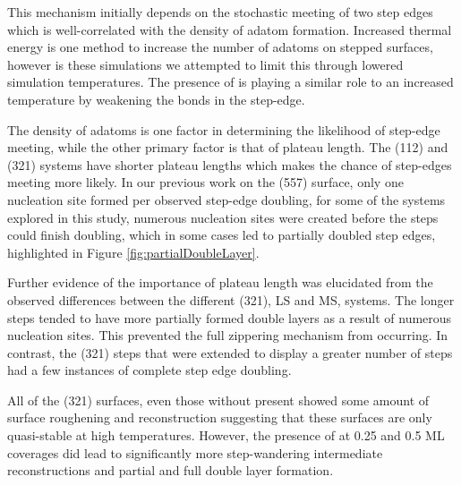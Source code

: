 This mechanism initially depends on the stochastic meeting of two step edges
which is well-correlated with the density of adatom formation. Increased
thermal energy is one method to increase the number of adatoms on stepped
surfaces, however is these simulations we attempted to limit this through
lowered simulation temperatures.  The presence of  is playing a similar
role to an increased temperature by weakening the  bonds in
the step-edge.

The density of adatoms is one factor in determining the likelihood of step-edge
meeting, while the other primary factor is that of plateau length. The (112)
and (321) systems have shorter plateau lengths which makes the chance of
step-edges meeting more likely.  In our previous work on the (557) surface,
only one nucleation site formed per observed step-edge doubling, for some of
the systems explored in this study, numerous nucleation sites were created
before the steps could finish doubling, which in some cases led to partially
doubled step edges, highlighted in Figure \ref{fig:partialDoubleLayer}.

Further evidence of the importance of plateau length was elucidated from the
observed differences between the different (321), LS and MS, systems. The
longer steps tended to have more partially formed double layers as
a result of numerous nucleation sites. This prevented the full
zippering mechanism from occurring. In contrast, the (321) steps that were
extended to display a greater number of steps had a few
instances of complete step edge doubling.

All of the (321) surfaces, even those without  present showed some amount of surface
roughening and reconstruction suggesting that these surfaces are only quasi-stable
at high temperatures. However, the presence of  at 0.25 and 0.5 ML
coverages did lead to significantly more step-wandering intermediate
reconstructions and partial and full double layer formation.

